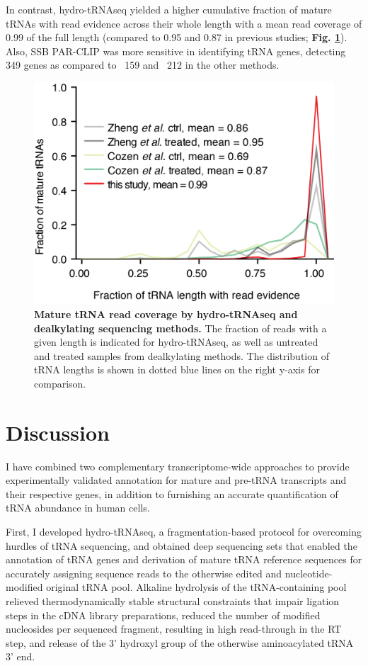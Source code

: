 \documentclass[12pt]{rockefeller}
\begin{document}
In contrast, hydro-tRNAseq yielded a higher cumulative fraction of mature tRNAs with read evidence across their whole length with a mean read coverage of 0.99 of the full length (compared to 0.95 and 0.87 in previous studies; \textbf{Fig. \ref{supp7}}). Also, SSB PAR-CLIP was more sensitive in identifying tRNA genes, detecting 349 genes as compared to ~159 and ~212 in the other methods.

\begin{figure}[!ht]%
\centering
\includegraphics{supp7.png}%
\caption[Mature tRNA read coverage by hydro-tRNAseq and dealkylating sequencing methods.]
{\textbf{Mature tRNA read coverage by hydro-tRNAseq and dealkylating sequencing methods.}
The fraction of reads with a given length is indicated for hydro-tRNAseq, as well as untreated and treated samples from dealkylating methods. The distribution of tRNA lengths is shown in dotted blue lines on the right y-axis for comparison.
}
\centering
\label{supp7}%
\end{figure}


\section{Discussion}
I have combined two complementary transcriptome-wide approaches to provide experimentally validated annotation for mature and pre-tRNA transcripts and their respective genes, in addition to furnishing an accurate quantification of tRNA abundance in human cells.

First, I developed hydro-tRNAseq, a fragmentation-based protocol for overcoming hurdles of tRNA sequencing, and obtained deep sequencing sets that enabled the annotation of tRNA genes and derivation of mature tRNA reference sequences for accurately assigning sequence reads to the otherwise edited and nucleotide-modified original tRNA pool. Alkaline hydrolysis of the tRNA-containing pool relieved thermodynamically stable structural constraints that impair ligation steps in the cDNA library preparations, reduced the number of modified nucleosides per sequenced fragment, resulting in high read-through in the RT step, and release of the 3’ hydroxyl group of the otherwise aminoacylated tRNA 3’ end. 
\end{document}
